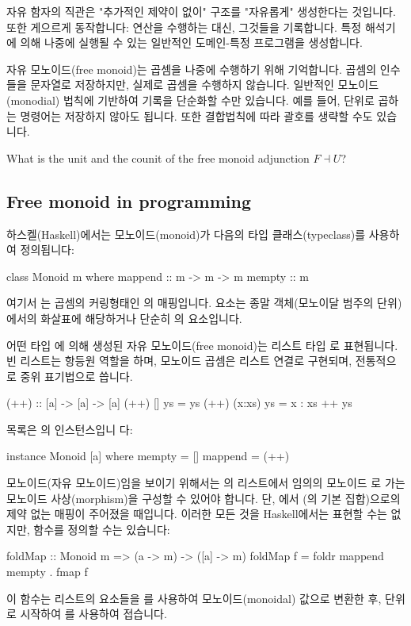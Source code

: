 \documentclass[DaoFP]{subfiles}
\begin{document}
자유 함자의 직관은 "추가적인 제약이 없이" 구조를 "자유롭게" 생성한다는 것입니다. 또한 게으르게 동작합니다: 연산을 수행하는 대신, 그것들을 기록합니다. 특정 해석기에 의해 나중에 실행될 수 있는 일반적인 도메인-특정 프로그램을 생성합니다.

자유 모노이드(free monoid)는 곱셈을 나중에 수행하기 위해 기억합니다. 곱셈의 인수들을 문자열로 저장하지만, 실제로 곱셈을 수행하지 않습니다. 일반적인 모노이드(monodial) 법칙에 기반하여 기록을 단순화할 수만 있습니다. 예를 들어, 단위로 곱하는 명령어는 저장하지 않아도 됩니다. 또한 결합법칙에 따라 괄호를 생략할 수도 있습니다.

\begin{exercise}
What is the unit and the counit of the free monoid adjunction $F \dashv U$?
\end{exercise}

\subsection{Free monoid in programming}

하스켈(Haskell)에서는 모노이드(monoid)가 다음의 타입 클래스(typeclass)를 사용하여 정의됩니다:
\begin{haskell}
class Monoid m where
  mappend :: m -> m -> m
  mempty  :: m
\end{haskell}
여기서 는 곱셈의 커링형태인 의 매핑입니다.  요소는 종말 객체(모노이달 범주의 단위)에서의 화살표에 해당하거나 단순히 의 요소입니다.

어떤 타입 에 의해 생성된 자유 모노이드(free monoid)는 리스트 타입 \hask{[a]}로 표현됩니다. 빈 리스트는 항등원 역할을 하며, 모노이드 곱셈은 리스트 연결로 구현되며, 전통적으로 중위 표기법으로 씁니다.
\begin{haskell}
(++) :: [a] -> [a] -> [a]
(++) []     ys = ys
(++) (x:xs) ys = x : xs ++ ys
\end{haskell}
목록은 의 인스턴스입니 다:
\begin{haskell}
instance Monoid [a] where
  mempty = []
  mappend = (++)
\end{haskell}

모노이드(자유 모노이드)임을 보이기 위해서는 의 리스트에서 임의의 모노이드 로 가는 모노이드 사상(morphism)을 구성할 수 있어야 합니다. 단, 에서 (의 기본 집합)으로의 제약 없는 매핑이 주어졌을 때입니다. 이러한 모든 것을 Haskell에서는 표현할 수는 없지만, 함수를 정의할 수는 있습니다:
\begin{haskell}
foldMap :: Monoid m => (a -> m) -> ([a] -> m)
foldMap f = foldr mappend mempty . fmap f
\end{haskell}
이 함수는 리스트의 요소들을 를 사용하여 모노이드(monoidal) 값으로 변환한 후, 단위 로 시작하여 를 사용하여 접습니다.
\end{document}
